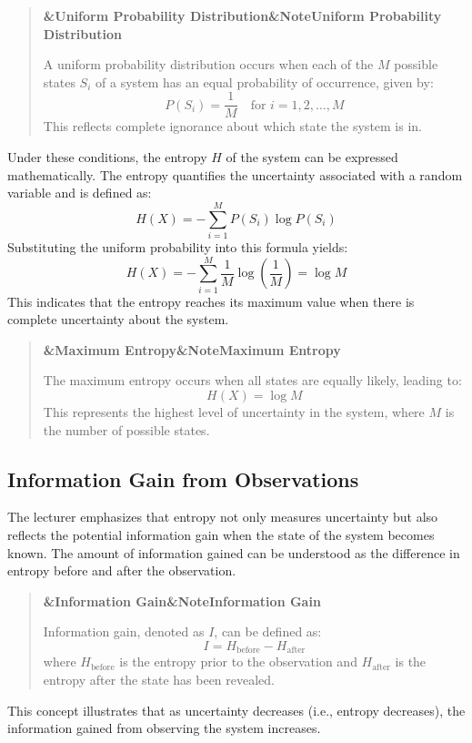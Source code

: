 \documentclass[a4paper]{article}
\newcommand{\boxheading}[1]{%
  \par\smallskip
  \noindent\textbf{\ifx&#1&Note\else#1\fi}\par
  \smallskip
}
\newenvironment{thmbox}[1][]{%
  \begin{quote}\color{blue!60!black}\boxheading{#1}\normalcolor
}{\end{quote}}
\newenvironment{defbox}[1][]{%
  \begin{quote}\color{green!40!black}\boxheading{#1}\normalcolor
}{\end{quote}}
\begin{document}
\begin{defbox}[Uniform Probability Distribution]
A uniform probability distribution occurs when each of the \( M \) possible states \( S_i \) of a system has an equal probability of occurrence, given by:
\[
P(S_i) = \frac{1}{M} \quad \text{for } i = 1, 2, \ldots, M
\]
This reflects complete ignorance about which state the system is in.
\end{defbox}

Under these conditions, the entropy \( H \) of the system can be expressed mathematically. The entropy quantifies the uncertainty associated with a random variable and is defined as:
\begin{equation}
H(X) = -\sum_{i=1}^{M} P(S_i) \log P(S_i)
\end{equation}
Substituting the uniform probability into this formula yields:
\begin{equation}
H(X) = -\sum_{i=1}^{M} \frac{1}{M} \log \left(\frac{1}{M}\right) = \log M
\end{equation}
This indicates that the entropy reaches its maximum value when there is complete uncertainty about the system.

\begin{thmbox}[Maximum Entropy]
The maximum entropy occurs when all states are equally likely, leading to:
\[
H(X) = \log M
\]
This represents the highest level of uncertainty in the system, where \( M \) is the number of possible states.
\end{thmbox}

\subsection{Information Gain from Observations}
The lecturer emphasizes that entropy not only measures uncertainty but also reflects the potential information gain when the state of the system becomes known. The amount of information gained can be understood as the difference in entropy before and after the observation.

\begin{defbox}[Information Gain]
Information gain, denoted as \( I \), can be defined as:
\[
I = H_{\text{before}} - H_{\text{after}}
\]
where \( H_{\text{before}} \) is the entropy prior to the observation and \( H_{\text{after}} \) is the entropy after the state has been revealed.
\end{defbox}

This concept illustrates that as uncertainty decreases (i.e., entropy decreases), the information gained from observing the system increases.
\end{document}
